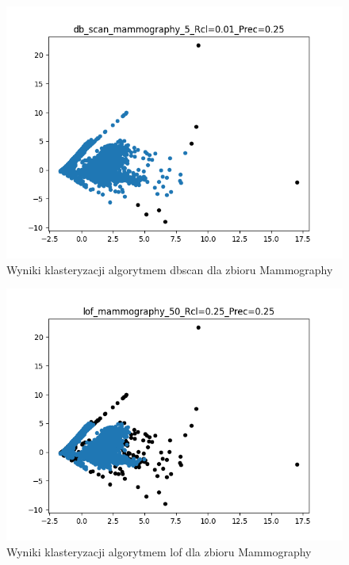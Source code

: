 \documentclass{classrep}
\begin{document}
{{            \begin{figure}[!htbp]
                \centering
                \includegraphics[width=\textwidth]{img/db_scan_mammography_5_-115827.png}
                \caption
                {Wyniki klasteryzacji algorytmem dbscan dla zbioru Mammography}
                \label{fig:mammo_dbscan}
            \end{figure}

            \begin{figure}[!htbp]
                \centering
                \includegraphics[width=\textwidth]{img/lof_mammography_50_-115830.png}
                \caption
                {Wyniki klasteryzacji algorytmem lof dla zbioru Mammography}
                \label{fig:mammo_lof}
            \end{figure}
            \FloatBarrier

}}
\end{document}
